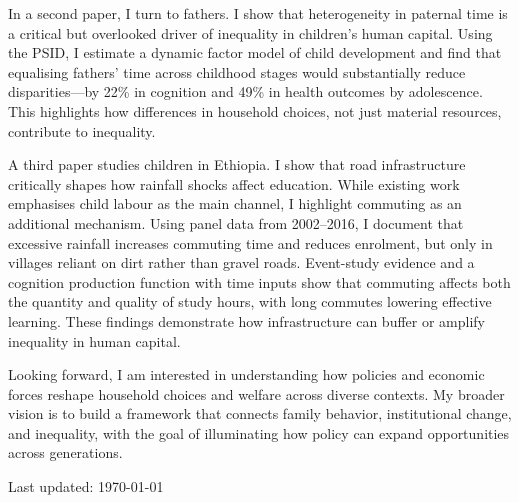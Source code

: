 \documentclass[11pt,a4paper]{article}
\begin{document}
In a second paper, I turn to fathers. I show that heterogeneity in paternal time is a critical but overlooked driver of inequality in children's human capital. Using the PSID, I estimate a dynamic factor model of child development and find that equalising fathers' time across childhood stages would substantially reduce disparities—by 22\% in cognition and 49\% in health outcomes by adolescence. This highlights how differences in household choices, not just material resources, contribute to inequality.

A third paper studies children in Ethiopia. I show that road infrastructure critically shapes how rainfall shocks affect education. While existing work emphasises child labour as the main channel, I highlight commuting as an additional mechanism. Using panel data from 2002–2016, I document that excessive rainfall increases commuting time and reduces enrolment, but only in villages reliant on dirt rather than gravel roads. Event-study evidence and a cognition production function with time inputs show that commuting affects both the quantity and quality of study hours, with long commutes lowering effective learning. These findings demonstrate how infrastructure can buffer or amplify inequality in human capital.

Looking forward, I am interested in understanding how policies and economic forces reshape household choices and welfare across diverse contexts. My broader vision is to build a framework that connects family behavior, institutional change, and inequality, with the goal of illuminating how policy can expand opportunities across generations.

\vfill
\begin{center}
    \small Last updated: \today
\end{center}
\end{document}
